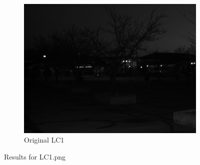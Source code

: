 \documentclass[12pt]{article}
\begin{document}
\begin{figure}[h!]
\begin{subfigure}[b]{0.3\textwidth}
            \includegraphics[width=\textwidth]{../images/LC1.png}
            \caption{Original LC1}
        \end{subfigure}
    
        \caption{Results for LC1.png}
    \end{figure}
\end{document}
